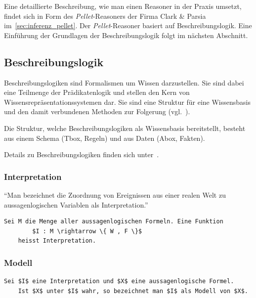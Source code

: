 Eine detaillierte Beschreibung, wie man einen Reasoner in der Praxis umsetzt, findet sich in Form des \textit{Pellet}-Reasoners der Firma Clark \& Parsia im~\autoref{sec:inferenz_pellet}. Der \textit{Pellet}-Reasoner basiert auf Beschreibungslogik.  Eine Einführung der Grundlagen der Beschreibungslogik folgt im nächsten Abschnitt.

\subsection{Beschreibungslogik}
\label{subsubsection:beschreibungslogik}
Beschreibungslogiken sind Formalismen um Wissen darzustellen. Sie sind dabei eine Teilmenge der Prädikatenlogik und stellen den Kern von Wissensrepräsentationssystemen dar.
Sie sind eine Struktur für eine Wissensbasis und den damit verbundenen Methoden zur Folgerung (vgl.~\cite{dl:baader2003}).

Die Struktur, welche Beschreibungslogiken als Wissensbasis bereitstellt, besteht aus einem Schema (Tbox, Regeln) und aus Daten (Abox, Fakten).

Details zu Beschreibungslogiken finden sich unter~\cite{dl:baader2003}.

\subsubsection{Interpretation}
\label{subsubsection:beschreibungslogik_Interpretation}
``Man bezeichnet die Zuordnung von Ereignissen aus einer realen Welt zu aussagenlogischen Variablen als Interpretation.''~\cite[S. 36]{laemmel}

\begin{lstlisting}[caption={Definition einer Interpretation \protect\footnotemark}]
    Sei M die Menge aller aussagenlogischen Formeln. Eine Funktion
        $I : M \rightarrow \{ W , F \}$
    heisst Interpretation.
\end{lstlisting}

\subsubsection{Modell}
\label{subsubsection:beschreibungslogik_modell}
\begin{lstlisting}[caption={Definition Modell \protect\footnotemark}]
    Sei $I$ eine Interpretation und $X$ eine aussagenlogische Formel.
    Ist $X$ unter $I$ wahr, so bezeichnet man $I$ als Modell von $X$.
\end{lstlisting}

